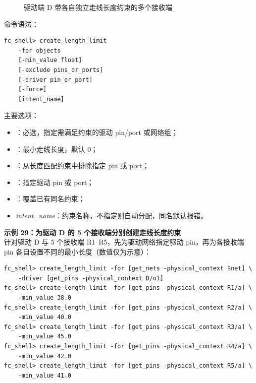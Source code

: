 \begin{figure}[htbp]
\centering
{}
\caption{驱动端 D 带各自独立走线长度约束的多个接收端}
\label{fig:receivers-individual-length}
\end{figure}

命令语法：
\begin{lstlisting}
fc_shell> create_length_limit
    -for objects
    [-min_value float]
    [-exclude pins_or_ports]
    [-driver pin_or_port]
    [-force]
    [intent_name]
\end{lstlisting}

主要选项：
\begin{itemize}
  \item {}：必选，指定需满足约束的驱动 pin/port 或网络组；
  \item {}：最小走线长度，默认 0；
  \item {}：从长度匹配约束中排除指定 pin 或 port；
  \item {}：指定驱动 pin 或 port；
  \item {}：覆盖已有同名约束；
  \item \textit{intent\_name}：约束名称，不指定则自动分配，同名默认报错。
\end{itemize}

\textbf{示例 29：为驱动 D 的 5 个接收端分别创建走线长度约束}\\
针对驱动 D 与 5 个接收端 R1--R5，先为驱动网络指定驱动 pin，再为各接收端 pin 各自设置不同的最小长度（数值仅为示意）：

\begin{lstlisting}
fc_shell> create_length_limit -for [get_nets -physical_context $net] \
    -driver [get_pins -physical_context D/o1]
fc_shell> create_length_limit -for [get_pins -physical_context R1/a] \
    -min_value 38.0
fc_shell> create_length_limit -for [get_pins -physical_context R2/a] \
    -min_value 40.0
fc_shell> create_length_limit -for [get_pins -physical_context R3/a] \
    -min_value 45.0
fc_shell> create_length_limit -for [get_pins -physical_context R4/a] \
    -min_value 42.0
fc_shell> create_length_limit -for [get_pins -physical_context R5/a] \
    -min_value 41.0
\end{lstlisting}

